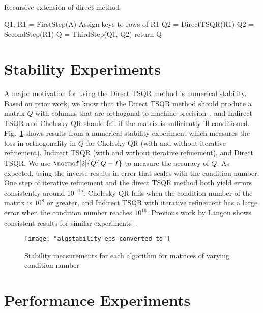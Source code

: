 \documentclass[10pt, conference, compsocconf]{IEEEtran}
\begin{document}
\begin{algorithm}
  \caption{Recursive extension of direct method}
  \label{alg:MRDirectRecursive}
  \begin{algorithmic}
    \State Q1, R1 = FirstStep(A)
      \State Assign keys to rows of R1
      \State Q2 = DirectTSQR(R1)
    \Else
      \State Q2 = SecondStep(R1)
    \EndIf
    \State Q = ThirdStep(Q1, Q2)
    \State return Q
  \EndFunction
  \end{algorithmic}
\end{algorithm}

\section{Stability Experiments}\label{sec:stability}

A major motivation for using the Direct TSQR method is numerical stability.  Based on prior work, we know that the Direct TSQR method should produce a matrix $Q$ with columns that are orthogonal to machine precision~\cite{demmel-2008-caqr2,Mori-2012-allreduce}, and Indirect TSQR and Cholesky QR should fail if the matrix is sufficiently ill-conditioned.  Fig.~\ref{fig:stability} shows results from a numerical stability experiment which measures the loss in orthogonality in $Q$ for Cholesky QR (with and without iterative refinement), Indirect TSQR (with and without iterative refinement),  and Direct TSQR.  We use $\normof[2]{Q^TQ - I}$ to measure the accuracy of $Q$.  As expected, using the inverse results in error that scales with the condition number.  One step of iterative refinement and the direct TSQR method both yield errors consistently around $10^{-15}$.  
Cholesky QR fails when the condition number of the matrix is $10^8$ or greater, and Indirect TSQR with iterative refinement has a large error when the condition number reaches $10^{16}$.  Previous work by Langou shows consistent results for similar experiments~\cite{langou2003-thesis}.

\begin{figure}
\centering
\texttt{[image: "algstability-eps-converted-to"]}
\caption{Stability measurements for each algorithm for matrices of varying condition number}
\label{fig:stability}
\end{figure}

\section{Performance Experiments}\label{sec:perf}
\end{document}
